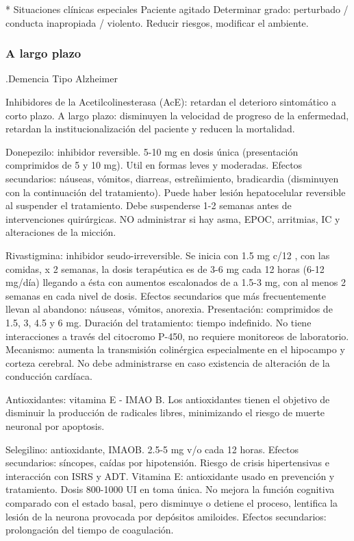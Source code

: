 \documentclass{scrbook}
\begin{document}
* Situaciones clínicas especiales Paciente agitado Determinar grado: perturbado / conducta inapropiada / violento. Reducir riesgos, modificar el ambiente.

\subsubsection*{A largo plazo}

.Demencia Tipo Alzheimer

Inhibidores de la Acetilcolinesterasa (AcE): retardan el deterioro sintomático a corto plazo. A largo plazo: disminuyen la velocidad de progreso de la enfermedad, retardan la institucionalización del paciente y reducen la mortalidad.

Donepezilo: inhibidor reversible. 5-10 mg en dosis única (presentación comprimidos de 5 y 10 mg). Util en formas leves y moderadas. Efectos secundarios: náuseas, vómitos, diarreas, estreñimiento, bradicardia (disminuyen con la continuación del tratamiento). Puede haber lesión hepatocelular reversible al suspender el tratamiento. Debe suspenderse 1-2 semanas antes de intervenciones quirúrgicas. NO administrar si hay asma, EPOC, arritmias, IC y alteraciones de la micción.

Rivastigmina: inhibidor seudo-irreversible. Se inicia con 1.5 mg c/12 , con las comidas, x 2 semanas, la dosis terapéutica es de 3-6 mg cada 12 horas (6-12 mg/día) llegando a ésta con aumentos escalonados de a 1.5-3 mg, con al menos 2 semanas en cada nivel de dosis. Efectos secundarios que más frecuentemente llevan al abandono: náuseas, vómitos, anorexia. Presentación: comprimidos de 1.5, 3, 4.5 y 6 mg. Duración del tratamiento: tiempo indefinido. No tiene interacciones a través del citocromo P-450, no requiere monitoreos de laboratorio. Mecanismo: aumenta la transmisión colinérgica especialmente en el hipocampo y corteza cerebral. No debe administrarse en caso existencia de alteración de la conducción cardíaca.

Antioxidantes: vitamina E - IMAO B. Los antioxidantes tienen el objetivo de disminuir la producción de radicales libres, minimizando el riesgo de muerte neuronal por apoptosis.

Selegilino: antioxidante, IMAOB. 2.5-5 mg v/o cada 12 horas. Efectos secundarios: síncopes, caídas por hipotensión. Riesgo de crisis hipertensivas e interacción con ISRS y ADT. Vitamina E: antioxidante usado en prevención y tratamiento. Dosis 800-1000 UI en toma única. No mejora la función cognitiva comparado con el estado basal, pero disminuye o detiene el proceso, lentifica la lesión de la neurona provocada por depósitos amiloides. Efectos secundarios: prolongación del tiempo de coagulación.
\end{document}

